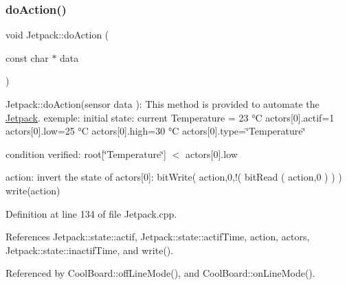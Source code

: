 \subsubsection{\texorpdfstring{do\+Action()}{doAction()}}
{\footnotesize\ttfamily void Jetpack\+::do\+Action (\begin{DoxyParamCaption}\item[{const char $\ast$}]{data }\end{DoxyParamCaption})}

Jetpack\+::do\+Action(sensor data )\+: This method is provided to automate the \hyperlink{classJetpack}{Jetpack}. exemple\+: initial state\+: current Temperature = 23 °C actors\mbox{[}0\mbox{]}.actif=1 actors\mbox{[}0\mbox{]}.low=25 °C actors\mbox{[}0\mbox{]}.high=30 °C actors\mbox{[}0\mbox{]}.type=\char`\"{}\+Temperature\char`\"{}

condition verified\+: root\mbox{[}\char`\"{}\+Temperature\char`\"{}\mbox{]} $<$ actors\mbox{[}0\mbox{]}.low

action\+: invert the state of actors\mbox{[}0\mbox{]}\+: bit\+Write( action,0,!( bit\+Read ( action,0 ) ) ) write(action) 

Definition at line 134 of file Jetpack.\+cpp.



References Jetpack\+::state\+::actif, Jetpack\+::state\+::actif\+Time, action, actors, Jetpack\+::state\+::inactif\+Time, and write().



Referenced by Cool\+Board\+::off\+Line\+Mode(), and Cool\+Board\+::on\+Line\+Mode().


